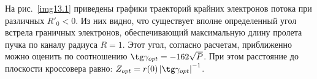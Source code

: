 На рис.~\ref{img13.1} приведены графики траекторий крайних электронов потока 
при различных \( R'_0 < 0 \). Из них видно, что существует вполне определенный 
угол встрела граничных электронов, обеспечивающий максимальную длину пролета 
пучка по каналу радиуса \( R = 1 \). Этот угол, согласно расчетам, 
приближенно можно оценить по соотношению \( \tg\gamma_{opt} = -162\sqrt{P} \). 
При этом расстояние до плоскости кроссовера равно:
\( Z_{opt} = r(0)\left| \tg\gamma_{opt} \right|^{-1} \).